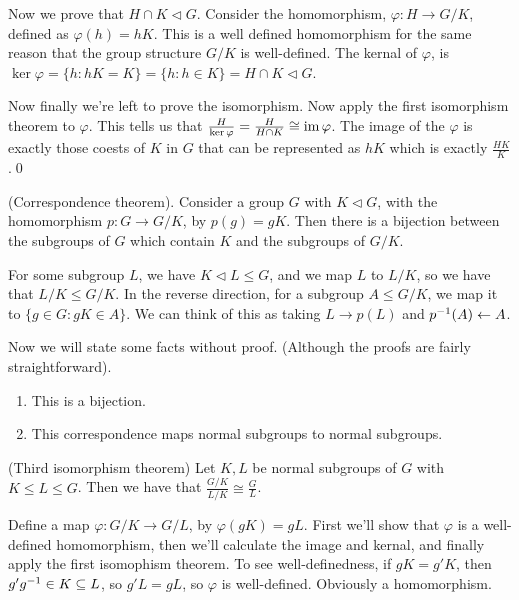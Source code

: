 \documentclass{article}
\newcommand{\nrm}{\triangleleft}
\begin{document}
\par
Now we prove that $ H\cap K\nrm G $. Consider the homomorphism, $ \varphi: H\to G/K $, defined as $ \varphi(h)=hK $. This is a well defined homomorphism for the same reason that the group structure $ G/K $ is well-defined. The kernal of $ \varphi $, is $ \ker \varphi = \{h: hK=K\}=\{h:h\in K\}=H\cap K\nrm G $.

\par
Now finally we're left to prove the isomorphism. Now apply the first isomorphism theorem to $ \varphi $. This tells us that $ \frac H{\ker \varphi}=\frac H {H\cap K}\cong \operatorname{im} \varphi $. The image of the $ \varphi $ is exactly those coests of $ K $ in $ G $ that can be represented as $ hK $ which is exactly $ \frac{HK}K $.\qed
\begin{theorem}
	(Correspondence theorem). Consider a group $ G $ with $ K\nrm G $, with the homomorphism $ p:G\to G/K $, by $ p(g)=gK $. Then there is a bijection between the subgroups of $ G $ which contain $ K $ and the subgroups of $ G/K $.
\end{theorem}
\pf For some subgroup $ L $, we have $ K\nrm L \le G $, and we map $ L $ to $ L/K $, so we have that $ L/K\le G/K $. In the reverse direction, for a subgroup $ A\le G/K $, we map it to $ \{g\in G: gK\in A\} $.
We can think of this as taking $ L\to p(L) $ and $ {p}^{-1}(A)\leftarrow A $.
\par Now we will state some facts without proof. (Although the proofs are fairly straightforward).
\begin{enumerate}
	\item This is a bijection.
	\item This correspondence maps normal subgroups to normal subgroups.
\end{enumerate}
\begin{theorem}
	(Third isomorphism theorem) Let $ K,L $ be normal subgroups of $ G $ with $ K\le L\le G $. Then we have that $ \frac{G/K}{L/K}\cong \frac GL $.
\end{theorem}
\pf Define a map $ \varphi: G/K \rightarrow G/L $, by $ \varphi(gK)=gL $. First we'll show that $ \varphi $ is a well-defined homomorphism, then we'll calculate the image and kernal, and finally apply the first isomophism theorem. To see well-definedness, if $ gK=g'K $, then $ g'{g}^{-1}\in K\subseteq L $, so $ g'L=gL $, so $ \varphi $ is well-defined. Obviously a homomorphism.
\end{document}
